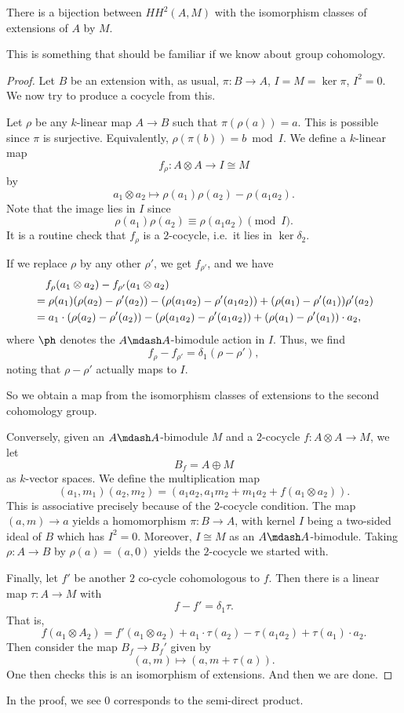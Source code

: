 \documentclass[a4paper]{article}
\newcommand\HH{H\!H}
\begin{document}
\begin{prop}
  There is a bijection between $\HH^2(A, M)$ with the isomorphism classes of extensions of $A$ by $M$.
\end{prop}
This is something that should be familiar if we know about group cohomology.

\begin{proof}
  Let $B$ be an extension with, as usual, $\pi: B \to A$, $I = M = \ker \pi$, $I^2 = 0$. We now try to produce a cocycle from this.

  Let $\rho$ be any $k$-linear map $A \to B$ such that $\pi(\rho(a)) = a$. This is possible since $\pi$ is surjective. Equivalently, $\rho(\pi(b)) = b \bmod I$. We define a $k$-linear map
  \[
    f_\rho: A \otimes A \to I \cong M
  \]
  by
  \[
    a_1 \otimes a_2 \mapsto \rho(a_1) \rho(a_2) - \rho(a_1 a_2).
  \]
  Note that the image lies in $I$ since
  \[
    \rho(a_1) \rho(a_2) \equiv \rho(a_1 a_2) \pmod I.
  \]
  It is a routine check that $f_\rho$ is a $2$-cocycle, i.e.\ it lies in $\ker \delta_2$.

  If we replace $\rho$ by any other $\rho'$, we get $f_{\rho'}$, and we have
  \begin{align*}
    &\hphantom{={}}f_\rho(a_1 \otimes a_2) - f_{\rho'} (a_1 \otimes a_2) \\
    &= \rho(a_1) (\rho(a_2) - \rho'(a_2)) - (\rho(a_1 a_2) - \rho'(a_1 a_2)) + (\rho(a_1) - \rho'(a_1))\rho'(a_2)\\
    &= a_1 \cdot (\rho(a_2) - \rho'(a_2)) - (\rho(a_1 a_2) - \rho'(a_1 a_2)) + (\rho(a_1) - \rho'(a_1)) \cdot a_2,
  \end{align*}
  where $\ph$ denotes the $A\mdash A$-bimodule action in $I$. Thus, we find
  \[
    f_\rho - f_{\rho'} = \delta_1(\rho - \rho'),
  \]
  noting that $\rho - \rho'$ actually maps to $I$.

  So we obtain a map from the isomorphism classes of extensions to the second cohomology group.

  Conversely, given an $A\mdash A$-bimodule $M$ and a $2$-cocycle $f: A \otimes A \to M$, we let
  \[
    B_f = A \oplus M
  \]
  as $k$-vector spaces. We define the multiplication map
  \[
    (a_1, m_1)(a_2, m_2) = (a_1 a_2, a_1 m_2 + m_1 a_2 + f(a_1 \otimes a_2)).
  \]
  This is associative precisely because of the 2-cocycle condition. The map $(a, m) \to a$ yields a homomorphism $\pi: B \to A$, with kernel $I$ being a two-sided ideal of $B$ which has $I^2 = 0$. Moreover, $I \cong M$ as an $A\mdash A$-bimodule. Taking $\rho: A \to B$ by $\rho(a) = (a, 0)$ yields the $2$-cocycle we started with.

  Finally, let $f'$ be another $2$ co-cycle cohomologous to $f$. Then there is a linear map $\tau: A \to M$ with
  \[
    f - f' = \delta_1 \tau.
  \]
  That is,
  \[
    f(a_1 \otimes A_2) = f'(a_1 \otimes a_2) + a_1 \cdot \tau(a_2) - \tau(a_1 a_2) + \tau(a_1) \cdot a_2.
  \]
  Then consider the map $B_f \to B_f'$ given by
  \[
    (a, m) \mapsto (a, m + \tau(a)).
  \]
  One then checks this is an isomorphism of extensions. And then we are done.
\end{proof}
In the proof, we see $0$ corresponds to the semi-direct product.
\end{document}
